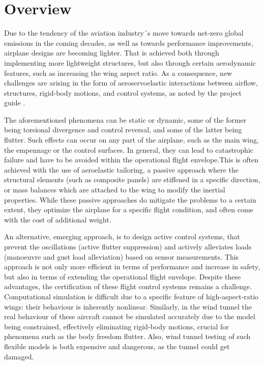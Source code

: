 

\chapter{Overview}
Due to the tendency of the aviation industry´s move towards net-zero global emissions in the coming decades, as well as towards performance improvements, airplane designs are becoming lighter. That is achieved both through implementing more lightweight structures, but also through certain aerodynamic features, such as increasing the wing aspect ratio. As a consequence, new challenges are arising in the form of aeroservoelastic interactions between airflow, structures, rigid-body motions, and control systems, as noted by the project guide \cite{Castro2026}. 

The aforementioned phenomena can be static or dynamic, some of the former being torsional divergence and control reversal, and some of the latter being flutter. Such effects can occur on any part of the airplane, such as the main wing, the empennage or the control surfaces. In general, they can lead to catastrophic failure and have to be avoided within the operational flight envelope.This is often achieved with the use of aeroelastic tailoring, a passive approach where the structural elements (such as composite panels) are stiffened in a specific direction, or mass balances which are attached to the wing to modify the inertial properties. While these passive approaches do mitigate the problems to a certain extent, they optimize the airplane for a specific flight condition, and often come with the cost of additional weight.

An alternative, emerging approach, is to design active control systems, that prevent the oscillations (active flutter suppression) and actively alleviates loads (manoeuvre and gust load alleviation) based on sensor measurements. This approach is not only more efficient in terms of performance and increase in safety, but also in terms of extending the operational flight envelope. Despite these advantages, the certification of these flight control systems remains a challenge. Computational simulation is difficult due to a specific feature of high-aspect-ratio wings: their behaviour is inherently nonlinear. Similarly, in the wind tunnel the real behaviour of these aircraft cannot be simulated accurately due to the model being constrained, effectively eliminating rigid-body motions, crucial for phenomena such as the body freedom flutter. Also, wind tunnel testing of such flexible models is both expensive and dangerous, as the tunnel could get damaged.

